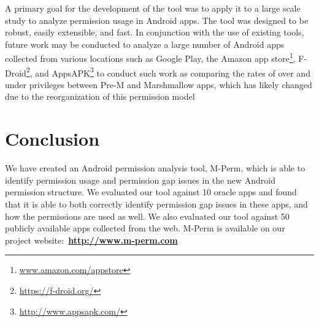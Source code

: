 \documentclass{sig-alternate-05-2015}
\newcommand{\todo}[1]{\textcolor{cyan}{\textbf{[#1]}}}
\begin{document}
A primary goal for the development of the tool was to apply it to a large scale study to analyze permission usage in Android apps. The tool was designed to be robust, easily extensible, and fast. In conjunction with the use of existing tools, future work may be conducted to analyze a large number of Android apps collected from various locations such as Google Play, the Amazon app store\footnote{\url{www.amazon.com/appstore}}, F-Droid\footnote{\url{https://f-droid.org/}}, and AppsAPK\footnote{\url{http://www.appsapk.com/}} to conduct such work as comparing the rates of over and under privileges between Pre-M and Marshmallow apps, which has likely changed due to the reorganization of this permission model









\section{Conclusion}
\label{sec: conclusion}

We have created an Android permission analysis tool, M-Perm, which is able to identify permission usage and permission gap issues in the new Android permission structure. We evaluated our tool against 10 oracle apps and found that it is able to both correctly identify permission gap issues in these apps, and how the permissions are used as well. We also evaluated our tool against 50 publicly available apps collected from the web. M-Perm is available on our project website:~\textbf{\url{http://www.m-perm.com}}




\end{document}

